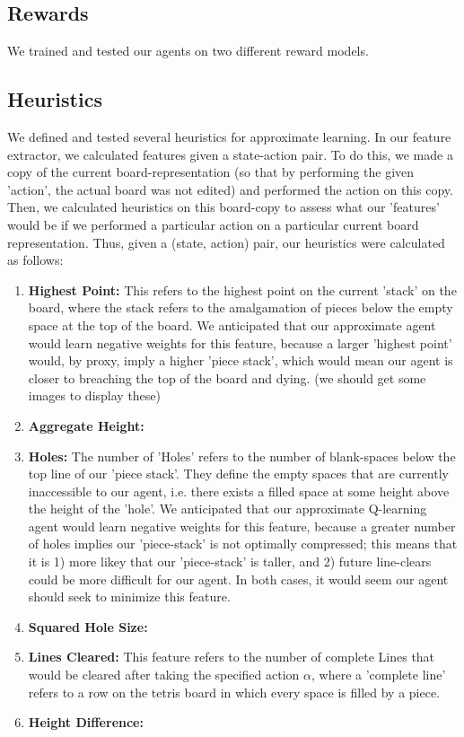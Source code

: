 \documentclass[11pt]{article}
\begin{document}
\subsection{Rewards}
We trained and tested our agents on two different reward models.

\subsection{Heuristics}
We defined and tested several heuristics for approximate learning. In our feature extractor, we calculated features given a state-action pair. To do this, we made a copy of the current board-representation (so that by performing the given 'action', the actual board was not edited) and performed the action on this copy. Then, we calculated heuristics on this board-copy to assess what our 'features' would be if we performed a particular action on a particular current board representation. Thus, given a (state, action) pair, our heuristics  were calculated as follows:
\begin{enumerate}
    \item \textbf{Highest Point:}
    This refers to the highest point on the current 'stack' on the board, where the stack refers to the amalgamation of pieces below the empty space at the top of the board. We anticipated that our approximate agent would learn negative weights for this feature, because a larger 'highest point' would, by proxy, imply a higher 'piece stack', which would mean our agent is closer to breaching the top of the board and dying. (we should get some images to display these)
    \item \textbf{Aggregate Height:}
    \item \textbf{Holes:}
    The number of 'Holes' refers to the number of blank-spaces below the top line of our 'piece stack'. They define the empty spaces that are currently inaccessible to our agent, i.e. there exists a filled space at some height above the height of the 'hole'. We anticipated that our approximate Q-learning agent would learn negative weights for this feature, because a greater number of holes implies our 'piece-stack' is not optimally compressed; this means that it is 1) more likey that our 'piece-stack' is taller, and 2) future line-clears could be more difficult for our agent. In both cases, it would seem our agent should seek to minimize this feature.
    \item \textbf{Squared Hole Size:}
    \item \textbf{Lines Cleared:}
    This feature refers to the number of complete Lines that would be cleared after taking the specified action $\alpha$, where a 'complete line' refers to a row on the tetris board in which every space is filled by a piece.
    \item \textbf{Height Difference:}
\end{enumerate}
\end{document}
